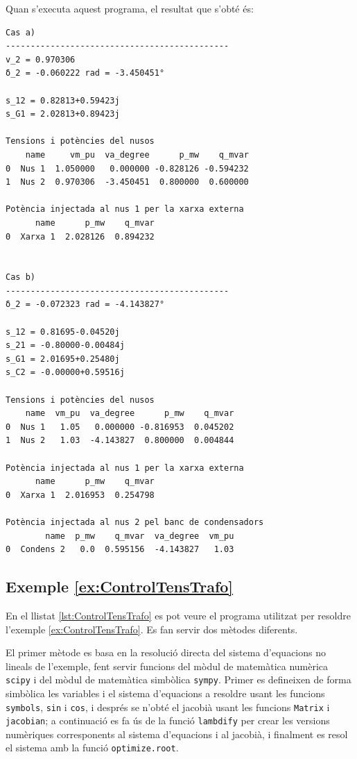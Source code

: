 Quan s'executa aquest programa, el resultat que s'obté és:
\lstset{
	language=,
	numbers=none,
	frame=none
}
\begin{lstlisting}
Cas a)
---------------------------------------------
v_2 = 0.970306
δ_2 = -0.060222 rad = -3.450451°

s_12 = 0.82813+0.59423j
s_G1 = 2.02813+0.89423j

Tensions i potències del nusos
    name     vm_pu  va_degree      p_mw    q_mvar
0  Nus 1  1.050000   0.000000 -0.828126 -0.594232
1  Nus 2  0.970306  -3.450451  0.800000  0.600000

Potència injectada al nus 1 per la xarxa externa
      name      p_mw    q_mvar
0  Xarxa 1  2.028126  0.894232


Cas b)
---------------------------------------------
δ_2 = -0.072323 rad = -4.143827°

s_12 = 0.81695-0.04520j
s_21 = -0.80000-0.00484j
s_G1 = 2.01695+0.25480j
s_C2 = -0.00000+0.59516j

Tensions i potències del nusos
    name  vm_pu  va_degree      p_mw    q_mvar
0  Nus 1   1.05   0.000000 -0.816953  0.045202
1  Nus 2   1.03  -4.143827  0.800000  0.004844

Potència injectada al nus 1 per la xarxa externa
      name      p_mw    q_mvar
0  Xarxa 1  2.016953  0.254798

Potència injectada al nus 2 pel banc de condensadors
        name  p_mw    q_mvar  va_degree  vm_pu
0  Condens 2   0.0  0.595156  -4.143827   1.03
\end{lstlisting} 


\hypertarget{exemple:ControlTensTrafo}{\subsection{Exemple \ref*{ex:ControlTensTrafo} \ControlTensTrafo}}
En el llistat \vref{lst:ControlTensTrafo} es pot veure el programa utilitzat per resoldre l'exemple \vref{ex:ControlTensTrafo}. Es fan servir dos mètodes diferents.

El primer mètode es basa en la resolució directa del sistema d'equacions no lineals de l'exemple, fent servir funcions  del mòdul de matemàtica numèrica \texttt{scipy} i del mòdul de matemàtica simbòlica \texttt{sympy}. Primer es defineixen de forma simbòlica les variables i el sistema d'equacions a resoldre usant les funcions \texttt{symbols}, \texttt{sin} i \texttt{cos}, i després se n'obté el jacobià usant les funcions \texttt{Matrix} i \texttt{jacobian}; a continuació es fa ús de la funció  \texttt{lambdify} per crear les versions numèriques corresponents al sistema d'equacions i al jacobià, i finalment es resol el sistema amb la funció \texttt{optimize.root}.


